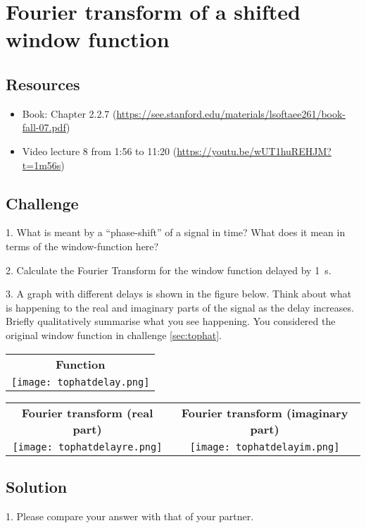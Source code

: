 \newpage
\section{Fourier transform of a shifted window function}

\subsection*{Resources}
\begin{itemize}
    \item Book: Chapter 2.2.7 (\url{https://see.stanford.edu/materials/lsoftaee261/book-fall-07.pdf})
    \item Video lecture 8 from 1:56 to 11:20 (\url{https://youtu.be/wUT1huREHJM?t=1m56s})
\end{itemize}

\subsection*{Challenge}
1. What is meant by a ``phase-shift'' of a signal in time? What does it mean in terms of the window-function here?

2. Calculate the Fourier Transform for the window function delayed by \SI{1}{\second}.

3. A graph with different delays is shown in the figure below. Think about what is happening to the real and imaginary parts of the signal as the delay increases. Briefly qualitatively summarise what you see happening. You considered the original window function in challenge \ref{sec:tophat}.

\begin{tabular}{c}
    \textbf{Function} \\
    \texttt{[image: tophatdelay.png]}
\end{tabular}

\begin{tabular}{cc}
    \textbf{Fourier transform (real part)} & \textbf{Fourier transform (imaginary part)}\\
    \texttt{[image: tophatdelayre.png]} & \texttt{[image: tophatdelayim.png]}
\end{tabular}

\subsection*{Solution}
1. Please compare your answer with that of your partner.

